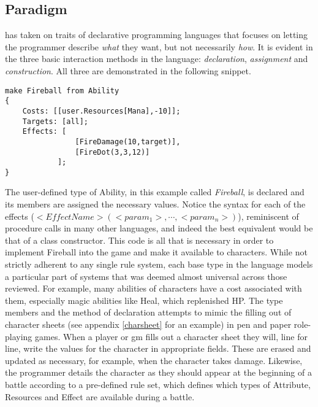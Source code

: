 \subsection{Paradigm}
\label{language:paradigm}
\langname{} has taken on traits of declarative programming languages that focuses on letting the programmer describe \emph{what} they want, but not necessarily \emph{how}. It is evident in the three basic interaction methods in the language: \emph{declaration}, \emph{assignment} and \emph{construction}. All three are demonstrated in the following snippet. 

\begin{lstlisting}[language=fflang]
make Fireball from Ability
{
	Costs: [[user.Resources[Mana],-10]];
	Targets: [all];
	Effects: [
				[FireDamage(10,target)],
				[FireDot(3,3,12)]
			];
}
\end{lstlisting}

The user-defined type of Ability, in this example called \emph{Fireball}, is declared and its members are assigned the necessary values. Notice the syntax for each of the effects ($<EffectName>(<param_1>, \cdots ,<param_n>)$), reminiscent of procedure calls in many other languages, and indeed the best equivalent would be that of a class constructor. This code is all that is necessary in order to implement Fireball into the game and make it available to characters.
While not strictly adherent to any single rule system, each base type in the language models a particular part of systems that was deemed almost universal across those reviewed. For example, many abilities of characters have a cost associated with them, especially magic abilities like Heal, which replenished HP. %
The type members and the method of declaration attempts to mimic the filling out of character sheets (see appendix \vref{charsheet} for an example) in pen and paper role-playing games. When a player or \ac{gm} fills out a character sheet they will, line for line, write the values for the character in appropriate fields. These are erased and updated as necessary, for example, when the character takes damage.
Likewise, the programmer details the character as they should appear at the beginning of a battle according to a pre-defined rule set, which defines which types of Attribute, Resources and Effect are available during a battle.
